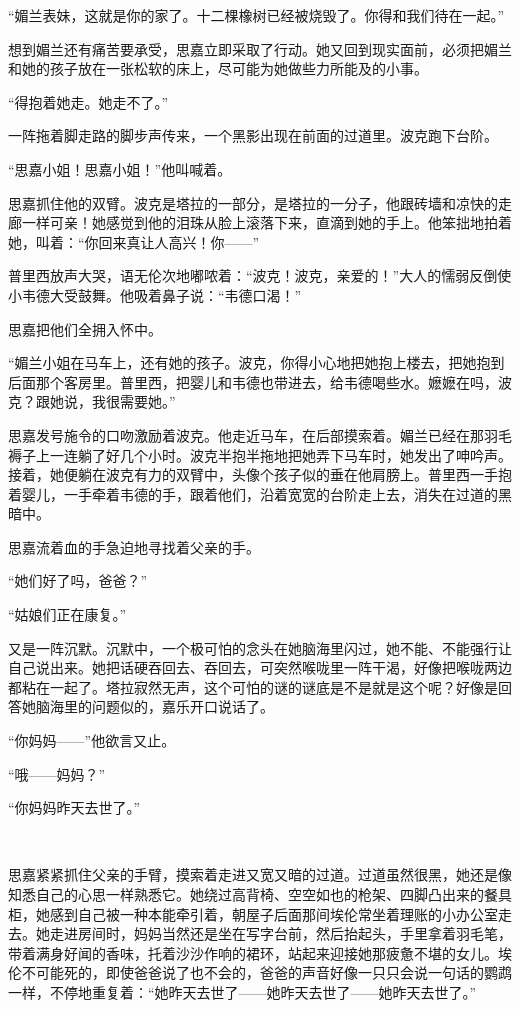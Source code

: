 \par “媚兰表妹，这就是你的家了。十二棵橡树已经被烧毁了。你得和我们待在一起。”
\par 想到媚兰还有痛苦要承受，思嘉立即采取了行动。她又回到现实面前，必须把媚兰和她的孩子放在一张松软的床上，尽可能为她做些力所能及的小事。
\par “得抱着她走。她走不了。”
\par 一阵拖着脚走路的脚步声传来，一个黑影出现在前面的过道里。波克跑下台阶。
\par “思嘉小姐！思嘉小姐！”他叫喊着。
\par 思嘉抓住他的双臂。波克是塔拉的一部分，是塔拉的一分子，他跟砖墙和凉快的走廊一样可亲！她感觉到他的泪珠从脸上滚落下来，直滴到她的手上。他笨拙地拍着她，叫着：“你回来真让人高兴！你——”
\par 普里西放声大哭，语无伦次地嘟哝着：“波克！波克，亲爱的！”大人的懦弱反倒使小韦德大受鼓舞。他吸着鼻子说：“韦德口渴！”
\par 思嘉把他们全拥入怀中。
\par “媚兰小姐在马车上，还有她的孩子。波克，你得小心地把她抱上楼去，把她抱到后面那个客房里。普里西，把婴儿和韦德也带进去，给韦德喝些水。嬷嬷在吗，波克？跟她说，我很需要她。”
\par 思嘉发号施令的口吻激励着波克。他走近马车，在后部摸索着。媚兰已经在那羽毛褥子上一连躺了好几个小时。波克半抱半拖地把她弄下马车时，她发出了呻吟声。接着，她便躺在波克有力的双臂中，头像个孩子似的垂在他肩膀上。普里西一手抱着婴儿，一手牵着韦德的手，跟着他们，沿着宽宽的台阶走上去，消失在过道的黑暗中。
\par 思嘉流着血的手急迫地寻找着父亲的手。
\par “她们好了吗，爸爸？”
\par “姑娘们正在康复。”
\par 又是一阵沉默。沉默中，一个极可怕的念头在她脑海里闪过，她不能、不能强行让自己说出来。她把话硬吞回去、吞回去，可突然喉咙里一阵干渴，好像把喉咙两边都粘在一起了。塔拉寂然无声，这个可怕的谜的谜底是不是就是这个呢？好像是回答她脑海里的问题似的，嘉乐开口说话了。
\par “你妈妈——”他欲言又止。
\par “哦——妈妈？”
\par “你妈妈昨天去世了。”
\par  
\par 思嘉紧紧抓住父亲的手臂，摸索着走进又宽又暗的过道。过道虽然很黑，她还是像知悉自己的心思一样熟悉它。她绕过高背椅、空空如也的枪架、四脚凸出来的餐具柜，她感到自己被一种本能牵引着，朝屋子后面那间埃伦常坐着理账的小办公室走去。她走进房间时，妈妈当然还是坐在写字台前，然后抬起头，手里拿着羽毛笔，带着满身好闻的香味，托着沙沙作响的裙环，站起来迎接她那疲惫不堪的女儿。埃伦不可能死的，即使爸爸说了也不会的，爸爸的声音好像一只只会说一句话的鹦鹉一样，不停地重复着：“她昨天去世了——她昨天去世了——她昨天去世了。”
